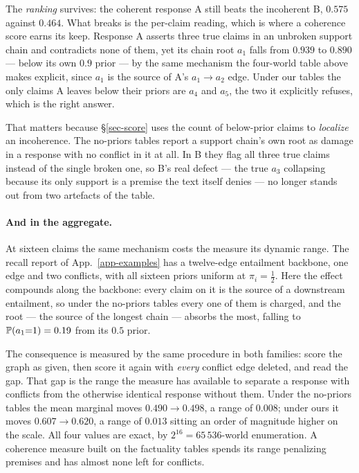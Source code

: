 The \emph{ranking} survives: the coherent response A still beats the incoherent B, $0.575$ against $0.464$. What
breaks is the per-claim reading, which is where a coherence score earns its keep. Response A asserts three true
claims in an unbroken support chain and contradicts none of them, yet its chain root $a_1$ falls from $0.939$ to
$0.890$ --- below its own $0.9$ prior --- by the same mechanism the four-world table above makes explicit, since
$a_1$ is the source of A's $a_1\!\to\!a_2$ edge. Under our tables the only claims A leaves below their priors are
$a_4$ and $a_5$, the two it explicitly refuses, which is the right answer.

That matters because \S\ref{sec-score} uses the count of below-prior claims to \emph{localize} an incoherence.
The no-priors tables report a support chain's own root as damage in a response with no conflict in it at all. In
B they flag all three true claims instead of the single broken one, so B's real defect --- the true $a_3$
collapsing because its only support is a premise the text itself denies --- no longer stands out from two
artefacts of the table.

\paragraph{And in the aggregate.} At sixteen claims the same mechanism costs the measure its dynamic range.
The recall report of App.~\ref{app-examples} has a twelve-edge entailment backbone, one \eqv{} edge and two
conflicts, with all sixteen priors uniform at $\pi_i=\tfrac12$. Here the effect compounds along the backbone:
every claim on it is the source of a downstream entailment, so under the no-priors tables every one of them is
charged, and the root --- the source of the longest chain --- absorbs the most, falling to
$\mathbb{P}\!\left( a_1{=}1 \right)=0.19$ from its $0.5$ prior.

The consequence is measured by the same procedure in both families: score the graph as given, then score it
again with \emph{every} conflict edge deleted, and read the gap. That gap is the range the measure has available
to separate a response with conflicts from the otherwise identical response without them. Under the no-priors
tables the mean marginal moves $0.490\to0.498$, a range of $0.008$; under ours it moves $0.607\to0.620$, a range
of $0.013$ sitting an order of magnitude higher on the scale. All four values are exact, by $2^{16}=65\,536$-world
enumeration. A coherence measure built on the factuality tables spends its range penalizing premises and has
almost none left for conflicts.

